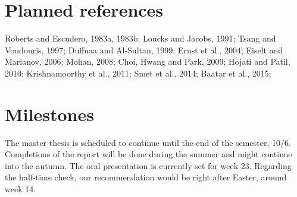 \documentclass{article}
\begin{document}
\pagebreak
\section*{Planned references}
Roberts and Escudero, 1983a, 1983b; Loucks and Jacobs, 1991; Tsang and Voudouris, 1997; Duffuaa and Al-Sultan, 1999; Ernst et al., 2004; Eiselt and Marianov, 2006; Mohan, 2008; Choi, Hwang and Park, 2009; Hojati and Patil, 2010; Krishnamoorthy et al., 2011; Smet et al., 2014; Baatar et al., 2015;

\section*{Milestones}
The master thesis is scheduled to continue until the end of the semester, 10/6. Completions of the report will be done during the summer and might continue into the autumn. The oral presentation is currently set for week 23. Regarding the half-time check, our recommendation would be right after Easter, around week 14.
\end{document}
